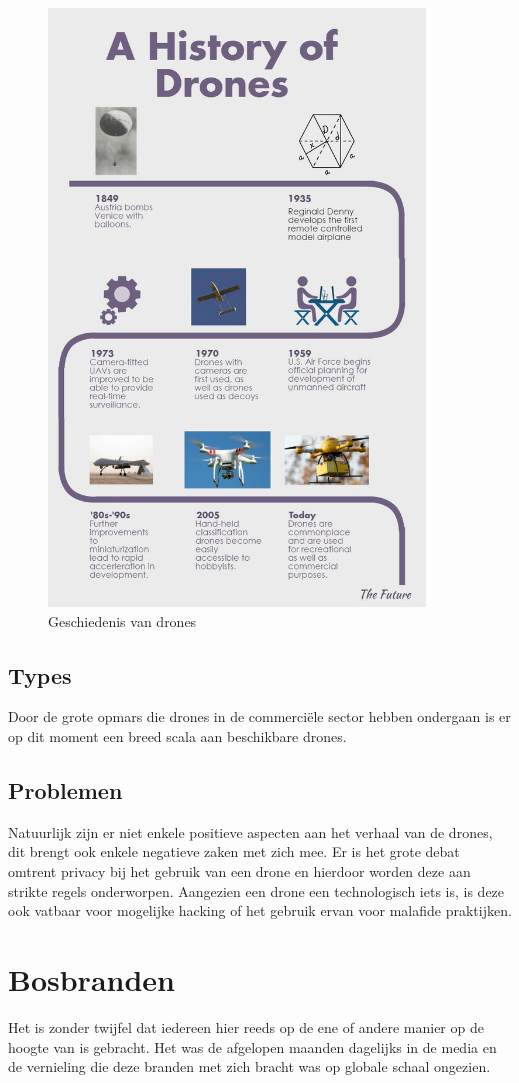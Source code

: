 \begin{figure}[htp]
    \centering
    \includegraphics[width=10cm]{bachproef/img/GeschiedenisDrone.jpg}
    \caption{Geschiedenis van drones \autocite{BestRCcopters}}
    \label{fig:GeschiedenisDrone}
\end{figure}

\subsection{Types}
\label{sec:types}

Door de grote opmars die drones in de commerciële sector hebben ondergaan is er op dit moment een breed scala aan beschikbare drones.  

\subsection{Problemen}
\label{sec:problemen}

Natuurlijk zijn er niet enkele positieve aspecten aan het verhaal van de drones, dit brengt ook enkele negatieve zaken met zich mee. Er is het grote debat omtrent privacy bij het gebruik van een drone en hierdoor worden deze aan strikte regels onderworpen. Aangezien een drone een technologisch iets is, is deze ook vatbaar voor mogelijke hacking of het gebruik ervan voor malafide praktijken.

\section{Bosbranden}

Het is zonder twijfel dat iedereen hier reeds op de ene of andere manier op de hoogte van is gebracht. Het was de afgelopen maanden dagelijks in de media en de vernieling die deze branden met zich bracht was op globale schaal ongezien.



